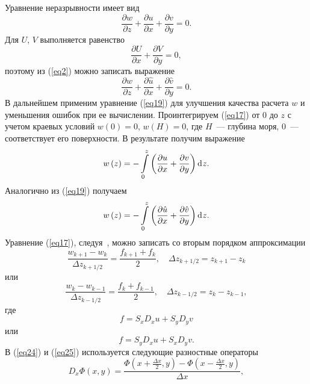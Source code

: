 \documentclass[press]{vestnik}
\begin{document}
Уравнение неразрывности имеет вид
\begin{equation}
\label{eq17}
\frac{\partial w}{\partial z}+\frac{\partial u}{\partial x}+\frac{\partial 
v}{\partial y}=0.
\end{equation}
Для $U$, $V$ выполняется равенство
\begin{equation}
\label{eq18}
\frac{\partial U}{\partial x}+\frac{\partial V}{\partial y}=0,
\end{equation}
поэтому из (\ref{eq2}) можно записать выражение
\begin{equation}
\label{eq19}
\frac{\partial w}{\partial z}+\frac{\partial \hat{{u}}}{\partial 
x}+\frac{\partial \hat{{v}}}{\partial y}=0.
\end{equation}
В дальнейшем применим уравнение (\ref{eq19}) для улучшения качества расчета $w$ и 
уменьшения ошибок при ее вычислении. Проинтегрируем (\ref{eq17}) от 0 до $z$ с 
учетом краевых условий $w\left( 0 \right)=0$, $w\left( H \right)=0$, где 
$H$~--- глубина моря, 0~--- соответствует его поверхности. В результате получим 
выражение
\begin{equation}
\label{eq20}
w\left( z \right)=-\int\limits_0^z \left( {\frac{\partial u}{\partial 
x}+\frac{\partial v}{\partial y}} \right)\d z .
\end{equation}
Аналогично из (\ref{eq19}) получаем
\begin{equation}
\label{eq21}
w\left( z \right)=-\int\limits_0^z \left( {\frac{\partial 
\hat{{u}}}{\partial x}+\frac{\partial \hat{{v}}}{\partial y}} \right)\d z.
\end{equation}
Уравнение (\ref{eq17}), следуя~\cite{B02}, можно записать со вторым порядком аппроксимации
\begin{equation}
\label{eq22}
\frac{w_{k+1} -w_{k} }{\Delta z_{k+1/2} }=\frac{f_{k+1} +f_{k} }{2},
\quad
\Delta z_{k+1/2} =z_{k+1} -z_{k} 
\end{equation}
или
\begin{equation}
\label{eq23}
\frac{w_{k} -w_{k-1} }{\Delta z_{k-1/2} }=\frac{f_{k} +f_{k-1} }{2},
\quad
\Delta z_{k-1/2} =z_{k} -z_{k-1} ,
\end{equation}
где
\begin{equation}
\label{eq24}
f=S_{x} D_{x} u+S_{y} D_{y} v
\end{equation}
или 
\begin{equation}
\label{eq25}
f=S_{y} D_{x} u+S_{x} D_{y} v.
\end{equation}
В (\ref{eq24}) и (\ref{eq25}) используется следующие разностные операторы
\begin{equation}
\label{eq26}
D_{x} \Phi\left( {x,y} \right)=\frac{\Phi\left( {x+\frac{\Delta x}{2},y} 
\right)-\Phi\left( {x-\frac{\Delta x}{2},y} \right)}{\Delta x},
\end{equation}
\end{document}
